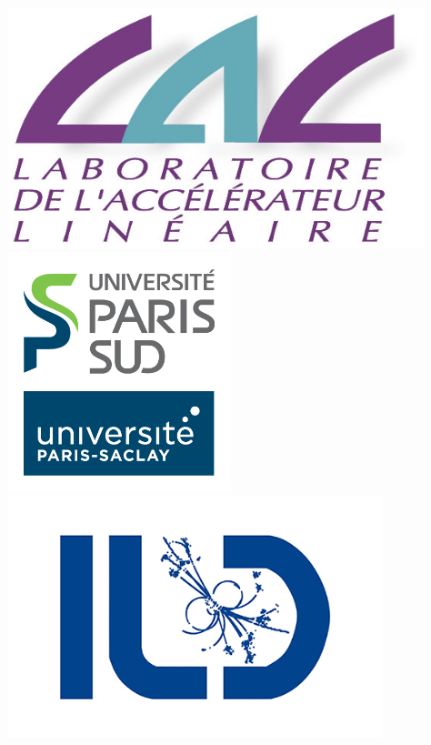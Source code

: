 \documentclass[a0,portrait]{a0poster}
\begin{document}
\begin{minipage}[b]{0.5\linewidth}
	\centering
\includegraphics[height=7cm]{figures/LAL.jpg}
\includegraphics[height=7cm]{figures/UPSUD.jpg}
\includegraphics[height=7cm]{figures/logo-ild.png}\\
\end{minipage}

\vspace{1cm} %

\end{document}
